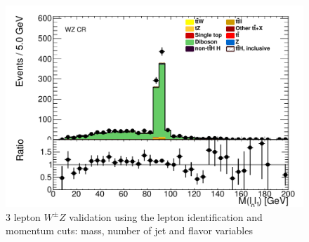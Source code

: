\begin{figure}[!htbp]
\begin{minipage}[h]{0.5\textwidth}
  \end{minipage}\hfill
  \begin{minipage}[h]{0.5\textwidth}
    \centering \includegraphics[width=\textwidth]{figs/WZ/standardCR_3l_WZ_MT_Mll01_thesis}
  \end{minipage}\hfill

\caption{3 lepton $W^{\pm}Z$ validation using the \tth lepton identification and momentum cuts: mass, number of jet and flavor variables} 
\label{figure:background_wz_incl}
\end{figure} 



